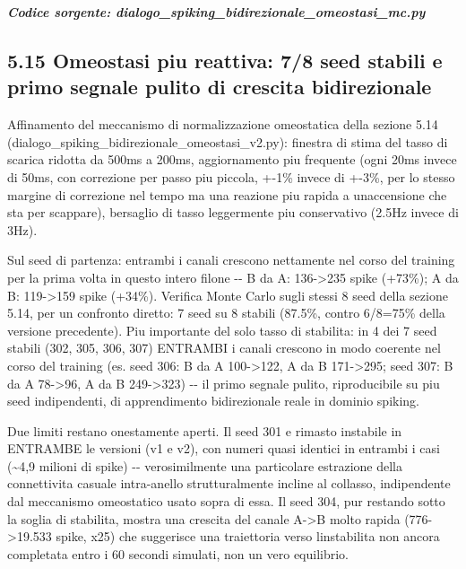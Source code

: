 \documentclass[
  italian,
]{article}
\begin{document}

\textit{\textbf{Codice sorgente: dialogo\_\allowbreak{}spiking\_\allowbreak{}bidirezionale\_\allowbreak{}omeostasi\_\allowbreak{}mc.py}}


\subsection{5.15 Omeostasi piu\textquotesingle{} reattiva: 7/8 seed stabili e primo segnale pulito di crescita bidirezionale}\label{omeostasi-piu-reattiva-78-seed-stabili-e-primo-segnale-pulito-di-crescita-bidirezionale}

Affinamento del meccanismo di normalizzazione omeostatica della sezione 5.14 (dialogo\_\allowbreak{}spiking\_\allowbreak{}bidirezionale\_\allowbreak{}omeostasi\_\allowbreak{}v2.py): finestra di stima del tasso di scarica ridotta da 500ms a 200ms, aggiornamento piu\textquotesingle{} frequente (ogni 20ms invece di 50ms, con correzione per passo piu\textquotesingle{} piccola, +-1\% invece di +-3\%, per lo stesso margine di correzione nel tempo ma una reazione piu\textquotesingle{} rapida a un\textquotesingle accensione che sta per scappare), bersaglio di tasso leggermente piu\textquotesingle{} conservativo (2.5Hz invece di 3Hz).

Sul seed di partenza: entrambi i canali crescono nettamente nel corso del training per la prima volta in questo intero filone -\/- B da A: 136-\textgreater235 spike (+73\%); A da B: 119-\textgreater159 spike (+34\%). Verifica Monte Carlo sugli stessi 8 seed della sezione 5.14, per un confronto diretto: 7 seed su 8 stabili (87.5\%, contro 6/8=75\% della versione precedente). Piu\textquotesingle{} importante del solo tasso di stabilita\textquotesingle: in 4 dei 7 seed stabili (302, 305, 306, 307) ENTRAMBI i canali crescono in modo coerente nel corso del training (es. seed 306: B da A 100-\textgreater122, A da B 171-\textgreater295; seed 307: B da A 78-\textgreater96, A da B 249-\textgreater323) -\/- il primo segnale pulito, riproducibile su piu\textquotesingle{} seed indipendenti, di apprendimento bidirezionale reale in dominio spiking.

Due limiti restano onestamente aperti. Il seed 301 e\textquotesingle{} rimasto instabile in ENTRAMBE le versioni (v1 e v2), con numeri quasi identici in entrambi i casi (\textasciitilde4,9 milioni di spike) -\/- verosimilmente una particolare estrazione della connettivita\textquotesingle{} casuale intra-anello strutturalmente incline al collasso, indipendente dal meccanismo omeostatico usato sopra di essa. Il seed 304, pur restando sotto la soglia di stabilita\textquotesingle, mostra una crescita del canale A-\textgreater B molto rapida (776-\textgreater19.533 spike, x25) che suggerisce una traiettoria verso l\textquotesingle instabilita\textquotesingle{} non ancora completata entro i 60 secondi simulati, non un vero equilibrio.
\end{document}
